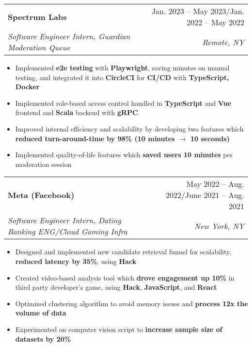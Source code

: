 \documentclass[letterpaper,11pt]{article}
\makeatletter
\newcommand{\resumeItem}[1]{
  \item\small{
    {#1 \vspace{-2pt}}
  }
}
\newcommand{\resumeSubheading}[4]{
  \vspace{-2pt}\item
    \begin{tabular*}{0.97\textwidth}[t]{l@{\extracolsep{\fill}}r}
      \textbf{#1} & #2 \\
      \textit{\small#3} & \textit{\small #4} \\
    \end{tabular*}\vspace{-7pt}
}
\newcommand{\resumeSubSubheading}[2]{
    \item
    \begin{tabular*}{0.97\textwidth}{l@{\extracolsep{\fill}}r}
      \textit{\small#1} & \textit{\small #2} \\
    \end{tabular*}\vspace{-7pt}
}
\newcommand{\resumeSubHeadingListEnd}{\end{itemize}}
\newcommand{\resumeItemListStart}{\begin{itemize}}
\newcommand{\resumeItemListEnd}{\end{itemize}\vspace{-5pt}}
\makeatother
\begin{document}
    \resumeSubheading
      {Spectrum Labs}{Jan. 2023 -- May 2023/Jan. 2022 -- May 2022}
      {Software Engineer Intern, Guardian Moderation Queue}{Remote, NY}
      \resumeItemListStart
        \resumeItem{Implemented \textbf{e2e testing} with \textbf{Playwright}, saving minutes on manual testing, and integrated it into \textbf{CircleCI} for \textbf{CI/CD }with \textbf{TypeScript, Docker}}
        \resumeItem{Implemented role-based access control handled in \textbf{TypeScript} and \textbf{Vue} frontend and \textbf{Scala} backend with \textbf{gRPC}}
        \resumeItem{Improved internal efficiency and scalability by developing two features which \textbf{reduced turn-around-time by 98\% (10 minutes $\rightarrow$ 10 seconds)}}
        \resumeItem{Implemented quality-of-life features which \textbf{saved users 10 minutes} per moderation session}
      \resumeItemListEnd
      

    \resumeSubheading
      {Meta (Facebook)}{May 2022 -- Aug. 2022/June 2021 -- Aug. 2021}
      {Software Engineer Intern, Dating Ranking ENG/Cloud Gaming Infra}{New York, NY}
      \resumeItemListStart
        \resumeItem{Designed and implemented new candidate retrieval funnel for scalability, \textbf{reduced latency by 35\%}, using \textbf{Hack}}
        \resumeItem{Created video-based analysis tool which \textbf{drove engagement up 10\%} in third party developer's game, using \textbf{Hack}, \textbf{JavaScript}, and \textbf{React}}
        \resumeItem{Optimized clustering algorithm to avoid memory issues and \textbf{process 12x the volume of data}}
        \resumeItem{Experimented on computer vision script to \textbf{increase sample size of datasets by 20\%}}
    \resumeItemListEnd

\end{document}
